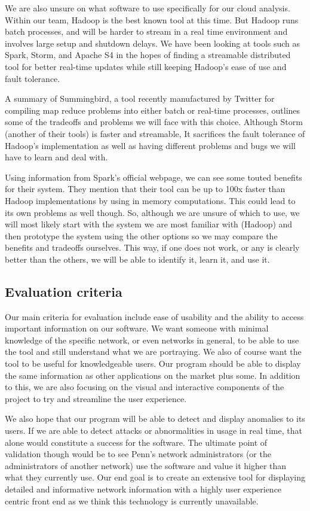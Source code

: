 \documentclass{sig-alternate}
\begin{document}
We are also unsure on what software to use specifically for our cloud analysis.
Within our team, Hadoop is the best known tool at this time. But Hadoop runs
batch processes, and will be harder to stream in a real time environment and
involves large setup and shutdown delays. We have been looking at tools such as
Spark, Storm, and Apache S4 in the hopes of finding a streamable distributed
tool for better real-time updates while still keeping Hadoop's ease of use and
fault tolerance.

A summary of Summingbird, a tool recently manufactured by Twitter for compiling
map reduce problems into either batch or real-time processes, outlines some of
the tradeoffs and problems we will face with this choice. Although Storm
(another of their tools) is faster and streamable, It sacrifices the fault
tolerance of Hadoop's implementation as well as having different problems and
bugs we will have to learn and deal with.\cite{TwitterSummingbird}

Using information from Spark's official webpage\cite{ApacheSpark}, we can see
some touted benefits for their system. They mention that their tool can be up to
100x faster than Hadoop implementations by using in memory computations. This
could lead to its own problems as well though. So, although we are unsure of
which to use, we will most likely start with the system we are most familiar
with (Hadoop) and then prototype the system using the other options so we may
compare the benefits and tradeoffs ourselves. This way, if one does not work, or
any is clearly better than the others, we will be able to identify it, learn it,
and use it.

\subsection{Evaluation criteria}

Our main criteria for evaluation include ease of usability and the ability to
access important information on our software. We want someone with minimal
knowledge of the specific network, or even networks in general, to be able to
use the tool and still understand what we are portraying. We also of course want
the tool to be useful for knowledgeable users. Our program should be able to
display the same information as other applications on the market plus some. In
addition to this, we are also focusing on the visual and interactive components
of the project to try and streamline the user experience.

We also hope that our program will be able to detect and display anomalies to
its users. If we are able to detect attacks or abnormalities in usage in real
time, that alone would constitute a success for the software. The ultimate point
of validation though would be to see Penn's network administrators (or the
administrators of another network) use the software and value it higher than
what they currently use. Our end goal is to create an extensive tool for
displaying detailed and informative network information with a highly user
experience centric front end as we think this technology is currently
unavailable.
\end{document}
